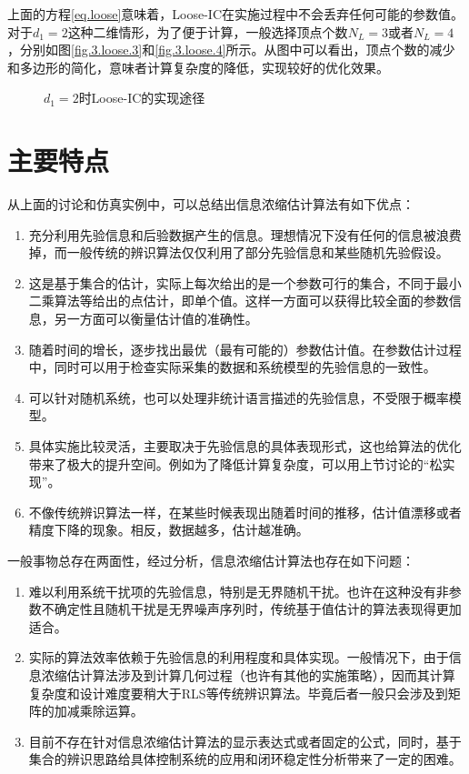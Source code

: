 上面的方程\eqref{eq.loose}意味着，Loose-IC在实施过程中不会丢弃任何可能的参数值。对于$d_{1}=2$这种二维情形，为了便于计算，一般选择顶点个数$N_{L}=3$或者$N_{L}=4$，分别如图\ref{fig.3.loose.3}和\ref{fig.3.loose.4}所示。从图中可以看出，顶点个数的减少和多边形的简化，意味者计算复杂度的降低，实现较好的优化效果。

\begin{figure}[!h]
	\centering
	\caption{$d_{1}=2$时Loose-IC的实现途径\upcite{}}	 %
	\label{fig.3.loose}	 %
\end{figure}

\section{主要特点}\label{sect:3.6}
从上面的讨论和仿真实例中，可以总结出信息浓缩估计算法有如下优点：
\begin{enumerate}
\item 充分利用先验信息和后验数据产生的信息。理想情况下没有任何的信息被浪费掉，而一般传统的辨识算法仅仅利用了部分先验信息和某些随机先验假设。
\item 这是基于集合的估计，实际上每次给出的是一个参数可行的集合，不同于最小二乘算法等给出的点估计，即单个值。这样一方面可以获得比较全面的参数信息，另一方面可以衡量估计值的准确性。
\item 随着时间的增长，逐步找出最优（最有可能的）参数估计值。在参数估计过程中，同时可以用于检查实际采集的数据和系统模型的先验信息的一致性。
\item 可以针对随机系统，也可以处理非统计语言描述的先验信息，不受限于概率模型。
\item 具体实施比较灵活，主要取决于先验信息的具体表现形式，这也给算法的优化带来了极大的提升空间。例如为了降低计算复杂度，可以用上节讨论的“松实现”。
\item 不像传统辨识算法一样，在某些时候表现出随着时间的推移，估计值漂移或者精度下降的现象。相反，数据越多，估计越准确。
\end{enumerate}

一般事物总存在两面性，经过分析，信息浓缩估计算法也存在如下问题：
\begin{enumerate}
\item 难以利用系统干扰项的先验信息，特别是无界随机干扰。也许在这种没有非参数不确定性且随机干扰是无界噪声序列时，传统基于值估计的算法表现得更加适合。
\item 实际的算法效率依赖于先验信息的利用程度和具体实现。一般情况下，由于信息浓缩估计算法涉及到计算几何过程（也许有其他的实施策略），因而其计算复杂度和设计难度要稍大于RLS等传统辨识算法。毕竟后者一般只会涉及到矩阵的加减乘除运算。
\item 目前不存在针对信息浓缩估计算法的显示表达式或者固定的公式，同时，基于集合的辨识思路给具体控制系统的应用和闭环稳定性分析带来了一定的困难。
\end{enumerate}

